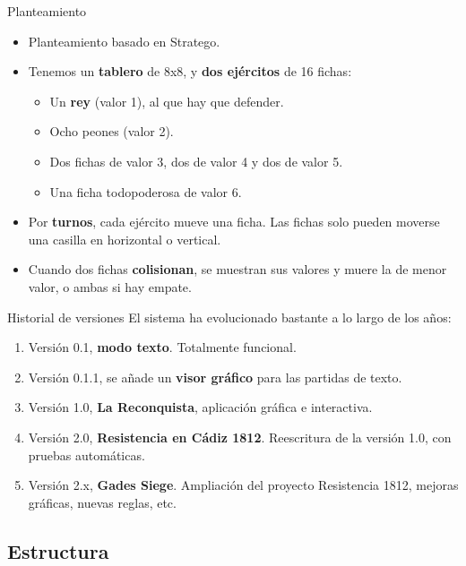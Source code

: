 \documentclass[smaller,spanish,xcolor=svgnames]{beamer}
\begin{document}
\begin{frame}{Planteamiento}
  \begin{block}{}
    \begin{itemize}
    \item Planteamiento basado en Stratego.
    \item Tenemos un \textbf{tablero} de 8x8, y \textbf{dos ejércitos} de 16 fichas:
      \begin{itemize}
      \item Un \textbf{rey} (valor 1), al que hay que defender.
      \item Ocho peones (valor 2).
      \item Dos fichas de valor 3, dos de valor 4 y dos de valor 5.
      \item Una ficha todopoderosa de valor 6.
      \end{itemize}
    \item Por \textbf{turnos}, cada ejército mueve una ficha. Las fichas solo
      pueden moverse una casilla en horizontal o vertical.
    \item Cuando dos fichas \textbf{colisionan}, se muestran sus valores y muere la de
      menor valor, o ambas si hay empate.
    \end{itemize}
  \end{block} 
\end{frame}

\begin{frame}{Historial de versiones}
El sistema ha evolucionado bastante a lo largo de los años:
\begin{enumerate}
\item Versión 0.1, \textbf{modo texto}. Totalmente funcional.
\item Versión 0.1.1, se añade un \textbf{visor gráfico} para las partidas de texto.
\item Versión 1.0, \textbf{La Reconquista}, aplicación gráfica e interactiva.
\item Versión 2.0, \textbf{Resistencia en Cádiz 1812}. Reescritura de la versión 1.0, con
  pruebas automáticas.
\item Versión 2.x, \textbf{Gades Siege}. Ampliación del proyecto Resistencia 1812,
  mejoras gráficas, nuevas reglas, etc.
\end{enumerate}  
\end{frame}

\subsection{Estructura}
\end{document}

